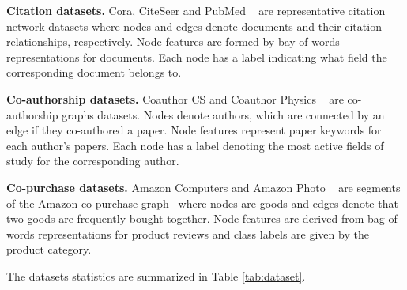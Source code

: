 \documentclass[sigconf]{acmart}
\begin{document}
\textbf{Citation datasets.} Cora, CiteSeer and PubMed ~\cite{sen2008collective} are representative citation network datasets where nodes and edges denote documents and their citation relationships, respectively. Node features are formed by bay-of-words representations for documents. Each node has a label indicating what field the corresponding document belongs to.

\textbf{Co-authorship datasets.} Coauthor CS and Coauthor Physics ~\cite{shchur2018pitfalls} are co-authorship graphs datasets. Nodes denote authors, which are connected by an edge if they co-authored a paper. Node features represent paper keywords for each author's papers. Each node has a label denoting the most active fields of study for the corresponding author.

\textbf{Co-purchase datasets.} Amazon Computers and Amazon Photo ~\cite{shchur2018pitfalls} are segments of the Amazon co-purchase graph~\cite{mcauley2015image} where nodes are goods and edges denote that two goods are frequently bought together. Node features are derived from bag-of-words representations for product reviews and class labels are given by the product category.

The datasets statistics are summarized in Table \ref{tab:dataset}.
\end{document}
